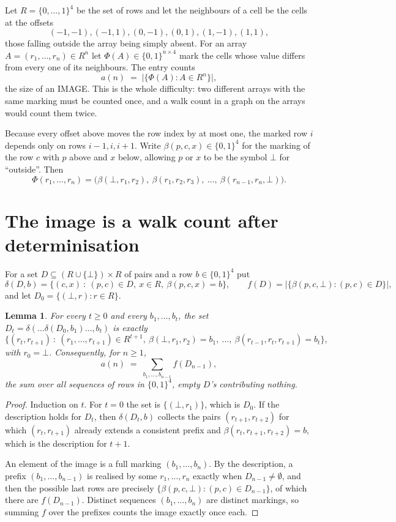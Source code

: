 \documentclass[11pt,a4paper]{article}
\theoremstyle{plain}
\newtheorem{lemma}[theorem]{Lemma}
\theoremstyle{definition}
\begin{document}
Let $R=\{0,\dots,1\}^{4}$ be the set of rows and let the neighbours of a cell be the
cells at the offsets
\[
(-1,-1), (-1,1), (0,-1), (0,1), (1,-1), (1,1),
\]
those falling outside the array being simply absent. For an array
$A=(r_1,\dots,r_n)\in R^n$ let $\Phi(A)\in\{0,1\}^{n\times4}$ mark the cells whose value
differs from every one of its neighbours. The entry counts
\[
a(n)\;=\;\bigl|\{\Phi(A):A\in R^n\}\bigr| ,
\]
the size of an IMAGE. This is the whole difficulty: two different arrays with the same marking
must be counted once, and a walk count in a graph on the arrays would count them twice.

Because every offset above moves the row index by at most one, the marked row $i$ depends only
on rows $i-1,i,i+1$. Write $\beta(p,c,x)\in\{0,1\}^{4}$ for the marking of the row $c$
with $p$ above and $x$ below, allowing $p$ or $x$ to be the symbol $\bot$ for ``outside''.
Then
\[
\Phi(r_1,\dots,r_n)=\bigl(\beta(\bot,r_1,r_2),\ \beta(r_1,r_2,r_3),\ \dots,\
\beta(r_{n-1},r_n,\bot)\bigr).
\]

\section{The image is a walk count after determinisation}

For a set $D\subseteq(R\cup\{\bot\})\times R$ of pairs and a row $b\in\{0,1\}^{4}$ put
\[
\delta(D,b)=\{(c,x)\ :\ (p,c)\in D,\ x\in R,\ \beta(p,c,x)=b\},\qquad
f(D)=\bigl|\{\beta(p,c,\bot):(p,c)\in D\}\bigr| ,
\]
and let $D_0=\{(\bot,r):r\in R\}$.

\begin{lemma}\label{lem:det}
For every $t\ge0$ and every $b_1,\dots,b_t$, the set
$D_t=\delta(\dots\delta(D_0,b_1)\dots,b_t)$ is exactly
\[
\{(r_t,r_{t+1})\ :\ (r_1,\dots,r_{t+1})\in R^{t+1},\ \beta(\bot,r_1,r_2)=b_1,\ \dots,\
\beta(r_{t-1},r_t,r_{t+1})=b_t\} ,
\]
with $r_0=\bot$. Consequently, for $n\ge1$,
\[
a(n)\;=\;\sum_{b_1,\dots,b_{n-1}}f(D_{n-1}),
\]
the sum over all sequences of rows in $\{0,1\}^{4}$, empty $D$'s contributing nothing.
\end{lemma}

\begin{proof}
Induction on $t$. For $t=0$ the set is $\{(\bot,r_1)\}$, which is $D_0$. If the description
holds for $D_t$, then $\delta(D_t,b)$ collects the pairs $(r_{t+1},r_{t+2})$ for which
$(r_t,r_{t+1})$ already extends a consistent prefix and
$\beta(r_t,r_{t+1},r_{t+2})=b$, which is the description for $t+1$.

An element of the image is a full marking $(b_1,\dots,b_n)$. By the description, a prefix
$(b_1,\dots,b_{n-1})$ is realised by some $r_1,\dots,r_n$ exactly when $D_{n-1}\neq
\emptyset$, and then the possible last rows are precisely
$\{\beta(p,c,\bot):(p,c)\in D_{n-1}\}$, of which there are $f(D_{n-1})$. Distinct
sequences $(b_1,\dots,b_n)$ are distinct markings, so summing $f$ over the prefixes counts the
image exactly once each.
\end{proof}
\end{document}
